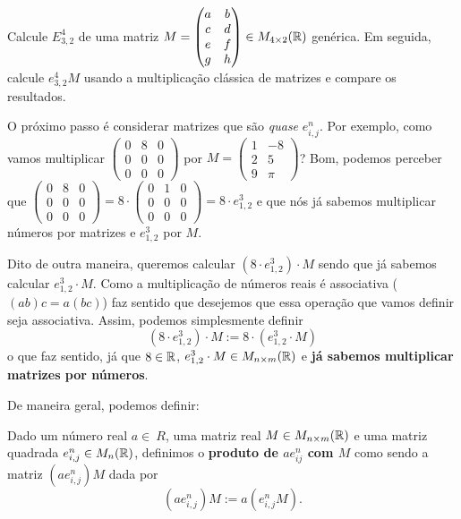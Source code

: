 \begin{exerc}
	Calcule $E^4_{3,2}$ de uma matriz $M=\begin{pmatrix}
	a & b\\
	c & d\\
	e & f\\
	g & h
	\end{pmatrix}\in M_{4\times 2}(\mathbb R)$ genérica. Em seguida, calcule $e^4_{3,2}M$ usando a multiplicação clássica de matrizes e compare os resultados.
\end{exerc}


\bigskip
O próximo passo é considerar matrizes que são \textit{quase} $e^n_{i,j}$. Por exemplo, como vamos multiplicar $\begin{pmatrix}
0 & 8 & 0\\
0 & 0 & 0\\
0&0&0
\end{pmatrix}$ por $M=\begin{pmatrix}
1 & -8\\
2 & 5\\
9 & \pi
\end{pmatrix}$? Bom, podemos perceber que $\begin{pmatrix}
0 & 8 & 0\\
0 & 0 & 0\\
0&0&0
\end{pmatrix}=8\cdot\begin{pmatrix}
0 & 1 & 0\\
0 & 0 & 0\\
0&0&0
\end{pmatrix}=8\cdot e^3_{1,2}$ e que nós já sabemos multiplicar números por matrizes e $e^3_{1,2}$ por $M$.

Dito de outra maneira, queremos calcular $(8\cdot e^3_{1,2})\cdot M$ sendo que já sabemos calcular $e^3_{1,2}\cdot M$. Como a multiplicação de números reais é associativa ($(ab)c=a(bc)$) faz sentido que desejemos que essa operação que vamos definir seja associativa. Assim, podemos simplesmente definir
\[(8\cdot e^3_{1,2})\cdot M:=8\cdot(e^3_{1,2}\cdot M)\]o que faz sentido, já que $8\in \mathbb R$, $e^3_{1,2}\cdot M\in M_{n\times m}(\mathbb R)$ e \textbf{já sabemos multiplicar matrizes por números}.

De maneira geral, podemos definir:

\begin{df}
	Dado um número real $a\in\ R$, uma matriz real $M\in M_{n\times m}(\mathbb R)$ e uma matriz quadrada $e^n_{i,j}\in M_n(\mathbb R)$, definimos o \textbf{produto de $ae^n_{ij}$ com $M$} como sendo a matriz $(ae^n_{i,j})M$ dada por
	\[(ae^n_{i,j})M:=a(e^n_{i,j}M).\]
\end{df}


